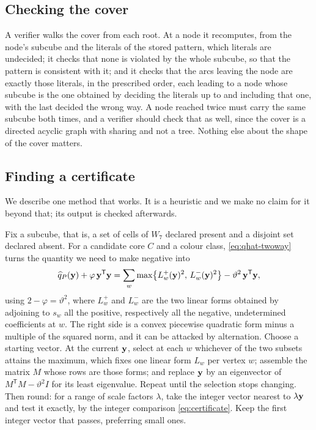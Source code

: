 \documentclass[11pt]{article}
\newcommand\vphi{\varphi}
\newcommand\thetaG{\vartheta}
\newcommand\tp{^{\mathsf T}}
\theoremstyle{definition}
\begin{document}
\subsection{Checking the cover}

A verifier walks the cover from each root.  At a node it recomputes, from the
node's subcube and the literals of the stored pattern, which literals are
undecided; it checks that none is violated by the whole subcube, so that the
pattern is consistent with it; and it checks that the arcs leaving the node
are exactly those literals, in the prescribed order, each leading to a node
whose subcube is the one obtained by deciding the literals up to and
including that one, with the last decided the wrong way.  A node reached
twice must carry the same subcube both times, and a verifier should check
that as well, since the cover is a directed acyclic graph with sharing and
not a tree.  Nothing else about the shape of the cover matters.

\subsection{Finding a certificate}\label{app:search}

We describe one method that works.  It is a heuristic and we make no claim
for it beyond that; its output is checked afterwards.

Fix a subcube, that is, a set of cells of $W_7$ declared present and a
disjoint set declared absent.  For a candidate core $C$ and a colour class,
\eqref{eq:qhat-twoway} turns the quantity we need to make negative into
\[
 \widehat q_P(\Zy)+\vphi\,\Zy\tp\Zy
 =\sum_{w}\max\bigl\{L^{+}_{w}(\Zy)^{2},\,L^{-}_{w}(\Zy)^{2}\bigr\}
   -\thetaG^{2}\,\Zy\tp\Zy ,
\]
using $2-\vphi=\thetaG^{2}$, where $L^{+}_{w}$ and $L^{-}_{w}$ are the two
linear forms obtained by adjoining to $s_w$ all the positive, respectively
all the negative, undetermined coefficients at $w$.  The right side is a
convex piecewise quadratic form minus a multiple of the squared norm, and it
can be attacked by alternation.  Choose a starting vector.  At the current
${\mathbf y}$, select at each $w$ whichever of the two subsets attains the maximum,
which fixes one linear form $L_w$ per vertex $w$; assemble the matrix $M$
whose rows are those forms; and replace ${\mathbf y}$ by an eigenvector of
$M\tp M-\thetaG^{2}I$ for its least eigenvalue.  Repeat until the selection
stops changing.  Then round: for a range of scale factors $\lambda$, take the
integer vector nearest to $\lambda{\mathbf y}$ and test it exactly, by the integer
comparison \eqref{eq:certificate}.  Keep the first integer vector that
passes, preferring small ones.
\end{document}
